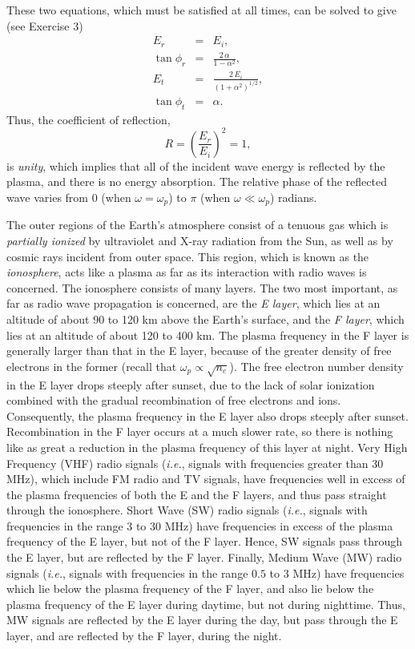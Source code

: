 These two equations, which must be satisfied at all times, can be solved to give (see Exercise 3)
\begin{eqnarray}
E_r &=& E_i,\label{e9.48}\\[0.5ex]
\tan\phi_r &=& \frac{2\,\alpha}{1-\alpha^2},\\[0.5ex]
E_t &=& \frac{2\,E_i}{(1+\alpha^2)^{1/2}},\\[0.5ex]
\tan\phi_t &=& \alpha.\label{e9.51}
\end{eqnarray}
Thus, the coefficient of reflection,
\begin{equation}
R = \left(\frac{E_r}{E_i}\right)^2  =1,
\end{equation}
is {\em unity}, which implies that all of the incident wave energy is reflected
by the plasma, and there is no energy absorption. The relative phase
of the reflected wave varies from 0 (when $\omega=\omega_p$) to
$\pi$  (when $\omega\ll \omega_p$) radians.

The outer regions of the Earth's atmosphere consist of a tenuous gas which is
{\em partially ionized}\/ by ultraviolet and X-ray radiation from the Sun, as well as by cosmic rays incident from outer space. This
region, which is known as the {\em ionosphere}, acts like a plasma
as far as its interaction with radio waves is concerned. The ionosphere
consists of many layers. The two most important, as far as radio
wave propagation is concerned, are the {\em E layer}, which lies at an altitude of 
about 90 to 120 km above the Earth's surface, and the {\em F layer}, which
lies at an altitude of about 120 to 400 km. The plasma frequency in the
F layer is generally larger than that in the E layer, because of the greater
density of free electrons in the former (recall that $\omega_p\propto \sqrt{n_e}$).
The free electron number density in the
E layer drops steeply after sunset, due to the lack of solar ionization combined with the gradual recombination of free electrons
and ions. Consequently, the plasma frequency in the E layer also drops steeply after sunset. Recombination in the F layer occurs at a much slower rate, so there is nothing like
as great a reduction in the plasma frequency of this layer at night.
Very High Frequency (VHF) radio signals ({\em i.e.}, signals with frequencies greater than 30 MHz), which include FM radio and TV signals, have frequencies well in excess
of the plasma frequencies of both the E and the F layers, and thus pass straight through
the ionosphere. Short Wave (SW) radio signals ({\em i.e.}, signals with frequencies in the
range 3 to 30 MHz) have frequencies in excess of the plasma
frequency of the E layer, but not of the F layer. Hence, SW signals pass through the
E layer, but are reflected by the F layer. 
 Finally, Medium Wave (MW) radio signals ({\em i.e.}, signals with frequencies in the range
$0.5$ to 3 MHz) have frequencies which lie below the plasma frequency of the F layer,
and also lie below the plasma frequency of the E layer during daytime, but not
during nighttime. Thus, MW signals are reflected by the E layer during the day,
but pass through the E layer, and are reflected by the F layer, during the night.

